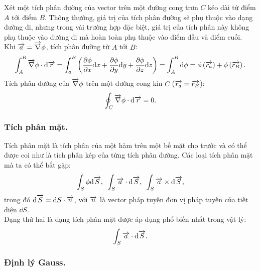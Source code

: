 \begin{appendices}
\begin{center}

\end{center}
Xét một tích phân đường của vector trên một đường cong trơn $C$ kéo dài từ điểm $A$ tới điểm $B$. Thông thường, giá trị của tích phân đường sẽ phụ thuộc vào dạng đường đi, nhưng trong vài trường hợp đặc biệt, giá trị của tích phân này không phụ thuộc vào đường đi mà hoàn toàn phụ thuộc vào điểm đầu và điểm cuối.\\
Khi $\overrightarrow{a}=\overrightarrow{\nabla}\phi$, tích phân đường từ $A$ tới $B$:
\begin{align*}
    \int_A^B\overrightarrow{\nabla}\phi\cdot\mathrm{d}\overrightarrow{r}=\int_a^B\left(\dfrac{\partial\phi}{\partial x}\mathrm{d} x+\dfrac{\partial\phi}{\partial y}\mathrm{d} y+\dfrac{\partial\phi}{\partial z}\mathrm{d} z\right)
    =\int_A^B\mathrm{d} \phi
    =\phi\left(\overrightarrow{r_a}\right)+\phi\left(\overrightarrow{r_B}\right).
\end{align*}
Tích phân đường của $\overrightarrow{\nabla}\phi$ trên một đường cong kín $C$ ($\overrightarrow{r_a}=\overrightarrow{r_B}$):
$$\oint_C\overrightarrow{\nabla}\phi\cdot\mathrm{d} \overrightarrow{r}=0.$$
\subsubsection{Tích phân mặt.}
Tích phân mặt là tích phân của một hàm trên một bề mặt cho trước và có thể được coi như là tích phân kép của từng tích phân đường. Các loại tích phân mặt mà ta có thể bắt gặp:
$$\int_S \phi\mathrm{d} \overrightarrow{S},\text{ }\int_S \overrightarrow{a}\cdot\mathrm{d} \overrightarrow{S},\text{ }\int_S \overrightarrow{a}\times\mathrm{d} \overrightarrow{S},$$
trong đó $\mathrm{d}\overrightarrow{S}=\mathrm{d} S\cdot \overrightarrow{n}$, với $\overrightarrow{n}$ là vector pháp tuyến đơn vị pháp tuyến của tiết diện $\dd S$.\\
Dạng thứ hai là dạng tích phân mặt được áp dụng phổ biến nhất trong vật lý:
$$\int_S \overrightarrow{a}\cdot\mathrm{d} \overrightarrow{S}.$$
\subsubsection{Định lý Gauss.}
\begin{center}
    


\end{center}
\end{appendices}
